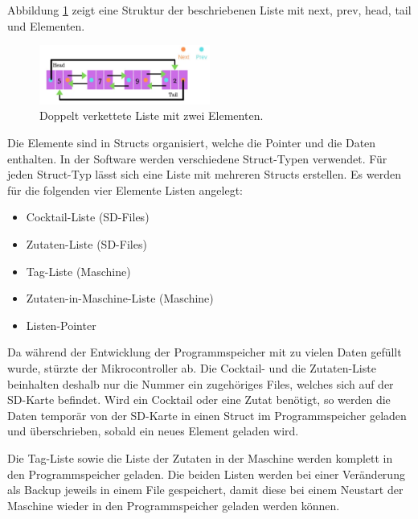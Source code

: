 Abbildung \ref{fig:Doubly_Linked_List_2_00} zeigt eine Struktur der beschriebenen Liste mit next, prev, head, tail und Elementen.

\begin{figure}[h!]
	\centering
	\includegraphics[width=0.5\textwidth]{graphics/Doubly_Linked_List_2_00}
	\caption{Doppelt verkettete Liste mit zwei Elementen.\cite{yadav_circular_2019}}
	\label{fig:Doubly_Linked_List_2_00}
\end{figure}


Die Elemente sind in Structs organisiert, welche die Pointer und die Daten enthalten. In der Software werden verschiedene Struct-Typen verwendet. Für jeden Struct-Typ lässt sich eine Liste mit mehreren Structs erstellen. Es werden für die folgenden vier Elemente Listen angelegt:

\begin{itemize}
\item Cocktail-Liste (SD-Files)
\item Zutaten-Liste (SD-Files)
\item Tag-Liste (Maschine)
\item Zutaten-in-Maschine-Liste (Maschine)
\item Listen-Pointer
\end{itemize}

Da während der Entwicklung der Programmspeicher mit zu vielen Daten gefüllt wurde, stürzte der Mikrocontroller ab. Die Cocktail- und die Zutaten-Liste beinhalten deshalb nur die Nummer ein zugehöriges Files, welches sich auf der SD-Karte befindet. Wird ein Cocktail oder eine Zutat benötigt, so werden die Daten temporär von der SD-Karte in einen Struct im Programmspeicher geladen und überschrieben, sobald ein neues Element geladen wird.

Die Tag-Liste sowie die Liste der Zutaten in der Maschine werden komplett in den Programmspeicher geladen. Die beiden Listen werden bei einer Veränderung als Backup jeweils in einem File gespeichert, damit diese bei einem Neustart der Maschine wieder in den Programmspeicher geladen werden können.